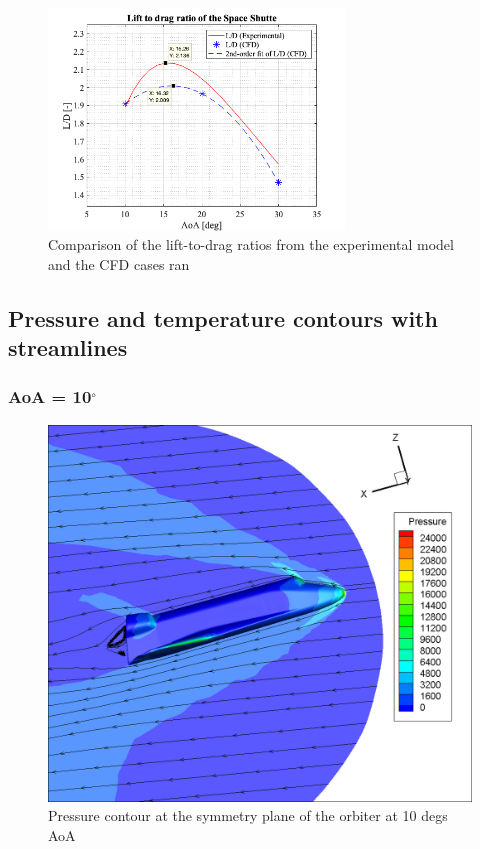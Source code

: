 \begin{figure}[H]
 \centering
 \includegraphics[width=0.7\textwidth]{matlab_images/L2D.png}
 \caption{Comparison of the lift-to-drag ratios from the experimental model and the CFD cases ran}
 \label{fig: l2d}
\end{figure}

\subsection{Pressure and temperature contours with streamlines}

\subsubsection{AoA = 10$^\circ$}
\begin{figure}[H]
 \centering
 \includegraphics[width=\textwidth]{report_images/10_sym_pressure_contour.png}
 \caption{Pressure contour at the symmetry plane of the orbiter at 10 degs AoA}
 \label{fig: 10_sym_pressure_contour}
\end{figure}

